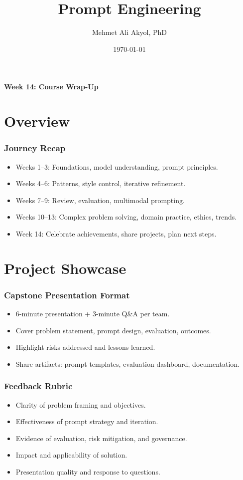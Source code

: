 \documentclass{beamer}
\title{Prompt Engineering}
\author{Mehmet Ali Akyol, PhD}
\institute{Ankara Medipol University}
\date{\today}
\begin{document}
\begin{frame}
    \titlepage
    \begin{center}
        \vspace{1cm}
        \textbf{Week 14: Course Wrap-Up}
    \end{center}
\end{frame}

\section{Overview}

\begin{frame}
    \frametitle{Journey Recap}
    \begin{itemize}
        \item Weeks 1--3: Foundations, model understanding, prompt principles.
        \item Weeks 4--6: Patterns, style control, iterative refinement.
        \item Weeks 7--9: Review, evaluation, multimodal prompting.
        \item Weeks 10--13: Complex problem solving, domain practice, ethics, trends.
        \item Week 14: Celebrate achievements, share projects, plan next steps.
    \end{itemize}
\end{frame}

\section{Project Showcase}

\begin{frame}
    \frametitle{Capstone Presentation Format}
    \begin{itemize}
        \item 6-minute presentation + 3-minute Q\&A per team.
        \item Cover problem statement, prompt design, evaluation, outcomes.
        \item Highlight risks addressed and lessons learned.
        \item Share artifacts: prompt templates, evaluation dashboard, documentation.
    \end{itemize}
\end{frame}

\begin{frame}
    \frametitle{Feedback Rubric}
    \begin{itemize}
        \item Clarity of problem framing and objectives.
        \item Effectiveness of prompt strategy and iteration.
        \item Evidence of evaluation, risk mitigation, and governance.
        \item Impact and applicability of solution.
        \item Presentation quality and response to questions.
    \end{itemize}
\end{frame}
\end{document}
